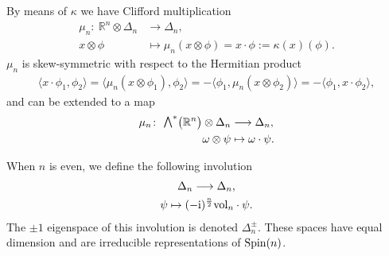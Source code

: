 \documentclass[pdftex]{sigma}
\newcommand{\ext}{\raise1pt\hbox{\small$\bigwedge$}}
\newcommand{\lra}{\longrightarrow}
\numberwithin{equation}{section}
\begin{document}
By means of $\kappa$ we have Clifford multiplication
\begin{align*}
\mu_n\colon \ \mathbb{R}^n\otimes \Delta_n &\lra \Delta_n,\\
x \otimes \phi &\mapsto \mu_n(x\otimes \phi)=x\cdot\phi :=\kappa(x)(\phi) .
\end{align*}
$\mu_n$ is skew-symmetric with respect to the Hermitian product
\begin{gather}
\langle x\cdot\phi_1 , \phi_2\rangle =\langle \mu_n(x\otimes \phi_1) , \phi_2\rangle =-\langle \phi_1 , \mu_n(x\otimes \phi_2)\rangle
=-\langle \phi_1 , x\cdot \phi_2\rangle , \label{clifford-skew-symmetric}
\end{gather}
and can be extended to a map
\begin{align*}
\mu_n\colon \ \ext^*\big(\mathbb{R}^n\big)\otimes \Delta_n &\lra \Delta_n,\\
\omega \otimes \psi &\mapsto \omega\cdot\psi.
\end{align*}

When $n$ is even, we define the following involution
\begin{gather*}
\Delta_n \longrightarrow \Delta_n, \\
\psi \mapsto (-{\rm i})^{n\over 2}{\rm vol}_n\cdot \psi.
\end{gather*}
The $\pm 1$ eigenspace of this involution is denoted $\Delta_n^\pm$. These spaces have equal dimension and are irreducible representations of ${\rm Spin}(n)$.
\end{document}
